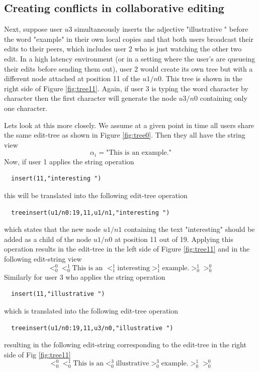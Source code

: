 \documentclass{amsart}
\begin{document}
\subsection{Creating conflicts in collaborative editing}
Next, suppose user $u3$ 
simultaneously inserts the adjective "illustrative "
before the word "example" in their own
local copies and that both users broadcast their edits to their peers, which
includes user 2 who is just watching the other two edit.  
In a high latency environment (or in a setting where the user's are queueing 
their edits before sending them out), user 2 would create its own tree
but with a different node attached at position 11 of the $u1/n0$. This tree
is shown in the right side of Figure \ref{fig:tree11}. Again, if user 3
is typing the word character by character then the first character will generate
the node $u3/n0$ containing only one character.

Lets look at this more closely.
We assume at a given point in time all users share the same edit-tree as shown 
in Figure \ref{fig:tree0}. Then they all have the string view
\[
\alpha_i= \text{"This is an example."}
\]
Now, if user 1 applies the string operation
\begin{verbatim}
  insert(11,"interesting ")
\end{verbatim}
this will be translated into the following edit-tree operation
\begin{verbatim}
  treeinsert(u1/n0:19,11,u1/n1,"interesting ")
\end{verbatim}
which states that the new node $u1/n1$ containing the text "interesting"
should be added as a child of the node $u1/n0$ at position 11 out of 19. Applying
this operation results in the edit-tree in the left side of Figure \ref{fig:tree11}
and in the following edit-string view
\[
 <_0^0 <^1_0 
 \text{This is an }<^1_1 
 \text{interesting}
>^1_1  \text{example.} >^1_0 >_0^0
\]
Similarly for user 3 who applies the string operation
\begin{verbatim}
  insert(11,"illustrative ")
\end{verbatim}
which is translated into the following edit-tree operation
\begin{verbatim}
  treeinsert(u1/n0:19,11,u3/n0,"illustrative ")
\end{verbatim}
resulting in the following edit-string corresponding to the edit-tree
in the right side of Fig \ref{fig:tree11}
\[
 <_0^0 <_0^1 
 \text{This is an} <^3_0 
 \text{illustrative}
>^3_0  \text{example.} >_0^1 >_0^0
\]
\end{document}
